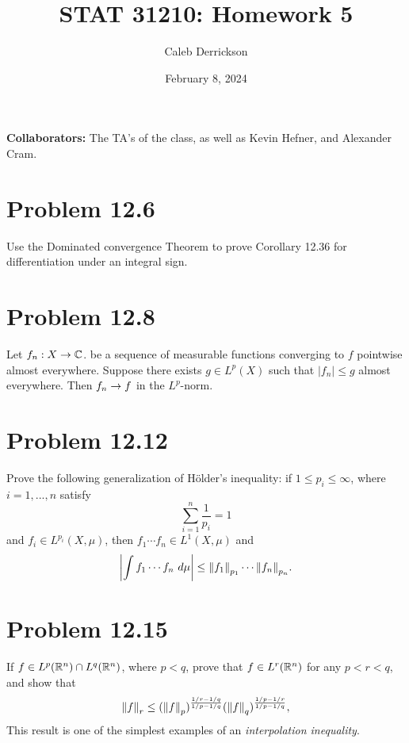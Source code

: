 

\title{STAT 31210: Homework 5}
\author{Caleb Derrickson}
\date{February 8, 2024}


\onehalfspacing
\maketitle
\allowdisplaybreaks
{\color{cit}\vspace{2mm}\noindent\textbf{Collaborators:}} The TA's of the class, as well as Kevin Hefner, and Alexander Cram.

\tableofcontents

\newpage
\section{Problem 12.6}
Use the Dominated convergence Theorem to prove Corollary 12.36 for differentiation under an integral sign. 

\newpage
\section{Problem 12.8}
Let $f_n : X \rightarrow \mathbb{C}$. be a sequence of measurable functions converging to $f$ pointwise almost everywhere. Suppose there exists $g \in L^p(X)$ such that $|f_n| \leq g$ almost everywhere. Then $f_n \rightarrow f$ in the $L^p$-norm. 

\newpage
\section{Problem 12.12}
Prove the following generalization of H\"older's inequality: if $1 \leq p_i \leq \infty$, where $i = 1, ..., n$ satisfy
\[\sum_{i = 1}^n \frac{1}{p_i} = 1\]
and $f_i \in L^{p_i}(X, \mu)$, then $f_1 \cdots f_n \in L^1(X, \mu)$ and 
\[\left| \int f_1 \cdots f_n \ d\mu\right| \leq \norm{f_1}_{p_1} \cdots \norm{f_n}_{p_n}.\]

\newpage
\section{Problem 12.15}
If $f \in L^p (\mathbb{R}^n) \cap L^q(\mathbb{R}^n)$, where $p < q$, prove that $f \in L^r(\mathbb{R}^n)$ for any $p < r < q$, and show that 
\[\norm{f}_r \leq (\norm{f}_p)^{\frac{1 / r - 1 / q}{1 / p - 1 / q}} (\norm{f}_q)^{\frac{1 / p - 1 / r}{1 / p - 1 / q}},\]
This result is one of the simplest examples of an \textit{interpolation inequality}.

